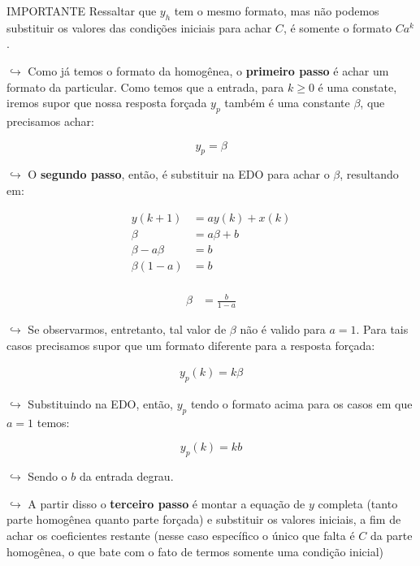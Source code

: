 \documentclass{article}
\begin{document}

IMPORTANTE Ressaltar que \(y_h\) tem o mesmo formato, mas não podemos
substituir os valores das condições iniciais para achar \(C\), é somente
o formato \(Ca^k\).

\(\hookrightarrow\) Como já temos o formato da homogênea, o
\textbf{primeiro passo} é achar um formato da particular. Como temos que
a entrada, para \(k \ge 0\) é uma constate, iremos supor que nossa
resposta forçada \(y_p\) também é uma constante \(\beta\), que
precisamos achar:

\[
y_p = \beta
\]

\(\hookrightarrow\) O \textbf{segundo passo}, então, é substituir na EDO
para achar o \(\beta\), resultando em:

\[
\begin{aligned}
y(k+1) &= ay(k) + x(k) \\ 
\beta &= a \beta + b  \\ 
\beta - a \beta &= b \\ 
\beta(1 - a) &= b \\ 
\end{aligned}
\]

\[
\begin{align}
\beta&= \frac{b}{1-a}
\end{align}
\]

\(\hookrightarrow\) Se observarmos, entretanto, tal valor de \(\beta\)
não é valido para \(a = 1\). Para tais casos precisamos supor que um
formato diferente para a resposta forçada:

\[
\begin{align}
y_p(k) = k\beta
\end{align}
\]

\(\hookrightarrow\) Substituindo na EDO, então, \(y_p\) tendo o formato
acima para os casos em que \(a = 1\) temos:

\[
y_p(k) = kb
\]

\(\hookrightarrow\) Sendo o \(b\) da entrada degrau.

\(\hookrightarrow\) A partir disso o \textbf{terceiro passo} é montar a
equação de \(y\) completa (tanto parte homogênea quanto parte forçada) e
substituir os valores iniciais, a fim de achar os coeficientes restante
(nesse caso específico o único que falta é \(C\) da parte homogênea, o
que bate com o fato de termos somente uma condição inicial)
\end{document}
